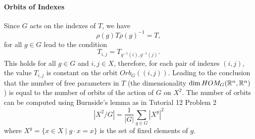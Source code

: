 \documentclass[english]{article}
\begin{document}
\paragraph{Orbits of Indexes}
Since $G$ acts on the indexes of $T$, we have 
\begin{equation}
    \rho(g)T\rho(g)^{-1}=T
    ,
    \label{eq:Tcondition}
\end{equation}    
for all $g\in G$ lead to the condition
\begin{equation}
    T_{i,j}=T_{g^{-1}(i),g^{-1}(j)}
    .
    \label{eq:indexCondition}
\end{equation}
This holds for all $g\in G$ and $i,j\in X$, therefore, for each pair of indexes $(i,j)$, the value $T_{i,j}$ is constant on the orbit $Orb_G((i,j))$. Leading to the conclusion that the number of free parameters in $T$ (the dimensionality 
$\dim HOM_G(\mathbb{R}^n,\mathbb{R}^n)$) is equal to the number of orbits of the action of $G$ on $X^2$. 
The number of orbits can be computed using Burnside's lemma as in Tutorial 12 Problem 2
\begin{equation}
    \left|X^2/G\right| = \frac{1}{|G|} \sum_{g \in G} |X^g|^2
\end{equation}
where $X^g = \{ x \in X \mid g \cdot x = x \}$ is the set of fixed elements of $g$.
\end{document}
